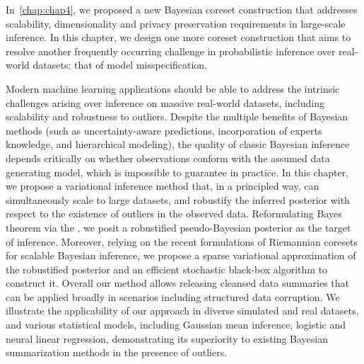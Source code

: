 {
	In~\cref{chap:chap4}, we proposed a new Bayesian coreset construction that addresses scalability, dimensionality and privacy preservation requirements in large-scale inference. In this chapter, we design one more coreset construction that aims to resolve another frequently occurring challenge in probabilistic inference over real-world datasets: that of model misspecification.
	
	Modern machine learning applications should be able to address the intrinsic challenges arising over inference on massive real-world datasets, including scalability and robustness to outliers. Despite the multiple benefits of Bayesian methods (such as uncertainty-aware predictions, incorporation of experts knowledge, and hierarchical modeling), the quality of classic Bayesian inference depends critically on whether observations conform with the assumed data generating model, which is impossible to guarantee in practice. In this chapter, we propose a variational inference method that, in a principled way, can simultaneously scale to large datasets, and robustify the inferred posterior with respect to the existence of outliers in the observed data. Reformulating Bayes theorem via the \bdiv, we posit a robustified pseudo-Bayesian posterior as the target of inference. Moreover, relying on the recent formulations of Riemannian coresets for scalable Bayesian inference, we propose a sparse variational approximation of the robustified posterior and an efficient stochastic black-box algorithm to construct it. Overall our method allows releasing cleansed data summaries  that can be applied broadly in scenarios including structured data corruption. We illustrate the applicability of our approach in diverse simulated and real datasets, and various statistical models, including Gaussian mean inference, logistic and neural linear regression, demonstrating its superiority to existing Bayesian summarization methods in the presence of outliers. %
}

